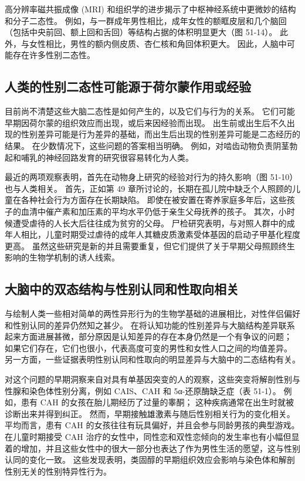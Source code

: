 高分辨率磁共振成像 (MRI) 和组织学的进步揭示了中枢神经系统中更微妙的结构和分子二态性。 例如，与一群成年男性相比，成年女性的额眶皮层和几个脑回（包括中央前回、额上回和舌回）等结构占据的体积明显更大（图 51-14）。 此外，与女性相比，男性的额内侧皮质、杏仁核和角回体积更大。 因此，人脑中可能存在许多性别二态性。


\subsection{人类的性别二态性可能源于荷尔蒙作用或经验}
目前尚不清楚这些大脑二态性是如何产生的，以及它们与行为的关系。 它们可能早期因荷尔蒙的组织效应而出现，或后来因经验而出现。 出生前或出生后不久出现的性别差异可能是行为差异的基础，而出生后出现的性别差异可能是二态经历的结果。 在少数情况下，这些问题的答案相当明确。 例如，对啮齿动物负责阴茎勃起和哺乳的神经回路发育的研究很容易转化为人类。

最近的两项观察表明，首先在动物身上研究的经验对行为的持久影响（图 51-10）也与人类相关。 首先，正如第 49 章所讨论的，长期在孤儿院中缺乏个人照顾的儿童在各种社会行为方面存在长期缺陷。 即使在被安置在寄养家庭多年后，这些孩子的血清中催产素和加压素的平均水平仍低于亲生父母抚养的孩子。 其次，小时候遭受虐待的人长大后往往成为贫穷的父母。 尸检研究表明，与对照人群中的成年人相比，儿童时期受过虐待的成年人其糖皮质激素受体基因的启动子甲基化程度更高。 虽然这些研究是新的并且需要重复，但它们提供了关于早期父母照顾终生影响的生物学机制的诱人线索。

\subsection{大脑中的双态结构与性别认同和性取向相关}

与绘制人类一些相对简单的两性异形行为的生物学基础的进展相比，对性伴侣偏好和性别认同的差异仍然知之甚少。 在将认知功能的性别差异与大脑结构差异联系起来方面进展甚微，部分原因是认知差异的存在本身仍然是一个有争议的问题； 如果它们存在，它们也很小，代表高度可变的男性和女性人口之间的均值差异。 另一方面，一些证据表明性别认同和性取向的明显差异与大脑中的二态结构有关。

对这个问题的早期洞察来自对具有单基因突变的人的观察，这些突变将解剖性别与性腺和染色体性别分离，例如 CAIS、CAH 和 5α-还原酶缺乏症（表 51-1）。 例如，患有 CAH 的女孩在胎儿期经历了过量的睾酮； 这种疾病通常在出生时就被诊断出来并得到纠正。 然而，早期接触雄激素与随后性别相关行为的变化相关。 平均而言，患有 CAH 的女孩往往有玩具偏好，并且会参与同龄男孩的典型游戏。 在儿童时期接受 CAH 治疗的女性中，同性恋和双性恋倾向的发生率也有小幅但显着的增加，并且这些女性中的很大一部分也表达了作为男性生活的愿望，这与性别认同的变化一致。 这些发现表明，类固醇的早期组织效应会影响与染色体和解剖性别无关的性别特异性行为。

